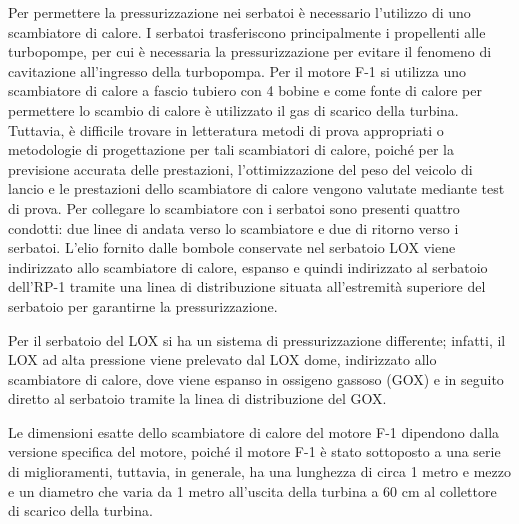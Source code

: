 Per permettere la pressurizzazione nei serbatoi è necessario l’utilizzo di uno scambiatore di calore.
I serbatoi trasferiscono principalmente i propellenti alle turbopompe, per cui è necessaria la pressurizzazione per evitare il fenomeno di cavitazione all'ingresso della turbopompa. 
Per il motore F-1 si utilizza uno scambiatore di calore a fascio tubiero con 4 bobine e come fonte di calore per permettere lo scambio di calore è utilizzato il gas di scarico della turbina.
Tuttavia, è difficile trovare in letteratura metodi di prova appropriati o metodologie di progettazione per tali scambiatori di calore, poiché per la previsione accurata delle prestazioni, l'ottimizzazione del peso del veicolo di lancio e le prestazioni dello scambiatore di calore vengono valutate mediante test di prova. 
Per collegare lo scambiatore con i serbatoi sono presenti quattro condotti: due linee di andata verso lo scambiatore e due di ritorno verso i serbatoi.
L'elio fornito dalle bombole conservate nel serbatoio LOX viene indirizzato allo scambiatore di calore, espanso e quindi indirizzato al serbatoio dell’RP-1 tramite una linea di distribuzione situata all'estremità superiore del serbatoio per garantirne la pressurizzazione. 

Per il serbatoio del LOX si ha un sistema di pressurizzazione differente; infatti, il LOX ad alta pressione viene prelevato dal LOX dome, indirizzato allo scambiatore di calore, dove viene espanso in ossigeno gassoso (GOX) e in seguito diretto al serbatoio tramite la linea di distribuzione del GOX.

Le dimensioni esatte dello scambiatore di calore del motore F-1 dipendono dalla versione specifica del motore, poiché il motore F-1 è stato sottoposto a una serie di miglioramenti, tuttavia, in generale, ha una lunghezza di circa 1 metro e mezzo e un diametro che varia da 1 metro all'uscita della turbina a 60 cm al collettore di scarico della turbina. 


